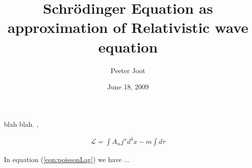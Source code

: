 \documentclass[]{eliblog}
\title{Schr\"{o}dinger Equation as approximation of Relativistic wave equation}
\author{Peeter Joot}
\date{June 18, 2009}
\newcommand{\LL}[0]{\mathcal{L}}
\begin{document}
\maketitle

blah blah.  \cite{doran2003gap}, \cite{mathworld:step}

\begin{align}\label{eqn:poissonLag}
\LL = \int A_\alpha j^\alpha d^4 x - m \int d\tau
\end{align}

In equation (\ref{eqn:poissonLag}) we have ...



\end{document}
